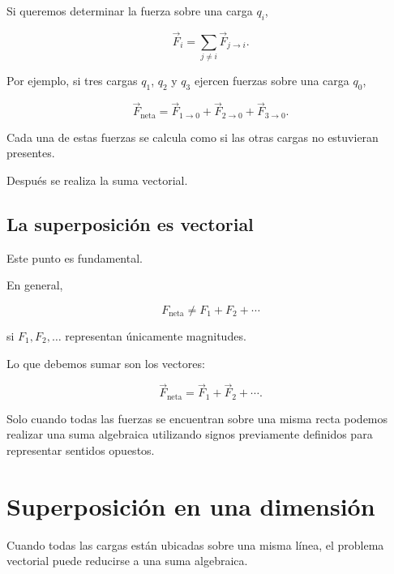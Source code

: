 Si queremos determinar la fuerza sobre una carga \(q_i\),

\begin{equation}
    \boxed{
    \vec{F}_i
    =
    \sum_{j\neq i}
    \vec{F}_{j\to i}
    }.
    \label{eq:superposicion_coulomb}
\end{equation}

Por ejemplo, si tres cargas \(q_1\), \(q_2\) y \(q_3\) ejercen fuerzas sobre
una carga \(q_0\),

\begin{equation}
    \boxed{
    \vec{F}_{\text{neta}}
    =
    \vec{F}_{1\to0}
    +
    \vec{F}_{2\to0}
    +
    \vec{F}_{3\to0}
    }.
\end{equation}

Cada una de estas fuerzas se calcula como si las otras cargas no estuvieran
presentes.

Después se realiza la suma vectorial.



\subsection{La superposición es vectorial}

Este punto es fundamental.

En general,

\[
\boxed{
F_{\text{neta}}
\neq
F_1+F_2+\cdots
}
\]

si \(F_1,F_2,\ldots\) representan únicamente magnitudes.

Lo que debemos sumar son los vectores:

\[
\boxed{
\vec{F}_{\text{neta}}
=
\vec{F}_1+\vec{F}_2+\cdots
}.
\]

Solo cuando todas las fuerzas se encuentran sobre una misma recta podemos
realizar una suma algebraica utilizando signos previamente definidos para
representar sentidos opuestos.



\section{Superposición en una dimensión}

Cuando todas las cargas están ubicadas sobre una misma línea, el problema
vectorial puede reducirse a una suma algebraica.

